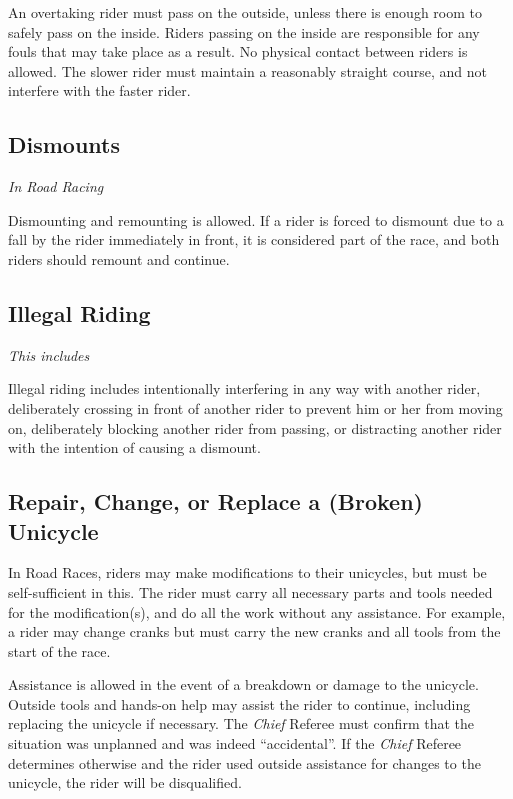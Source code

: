An overtaking rider must pass on the outside, unless there is enough room to safely pass on the inside.
Riders passing on the inside are responsible for any fouls that may take place as a result.
No physical contact between riders is allowed.
The slower rider must maintain a reasonably straight course, and not interfere with the faster rider.

\subsection{Dismounts}

\textit{In Road Racing} 

Dismounting and remounting is allowed. 
If a rider is forced to dismount due to a fall by the rider immediately in front, it is considered part of the race, and both riders should remount and continue.

\subsection{Illegal Riding}

\textit{This includes}

Illegal riding includes intentionally interfering in any way with another rider, deliberately crossing in front of another rider to prevent him or her from moving on, deliberately blocking another rider from passing, or distracting another rider with the intention of causing a dismount.

\subsection{Repair, Change, or Replace a (Broken) Unicycle}
In Road Races, riders may make modifications to their unicycles, but must be self-sufficient in this.
The rider must carry all necessary parts and tools needed for the modification(s), and do all the work without any assistance.
For example, a rider may change cranks but must carry the new cranks and all tools from the start of the race.

Assistance is allowed in the event of a breakdown or damage to the unicycle.
Outside tools and hands-on help may assist the rider to continue, including replacing the unicycle if necessary.
The \textit{Chief} Referee must confirm that the situation was unplanned and was indeed ``accidental''.
If the \textit{Chief} Referee determines otherwise and the rider used outside assistance for changes to the unicycle, the rider will be disqualified.

